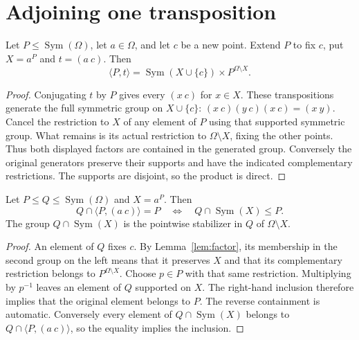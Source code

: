 \documentclass[a4paper,11pt]{article}
\newcommand{\Sym}{\operatorname{Sym}}\newcommand{\Alt}{\operatorname{Alt}}
\newcommand{\gen}[1]{\langle#1\rangle}
\begin{document}
\section{Adjoining one transposition}
\begin{lemma}\label{lem:factor}
Let $P\leq\Sym(\Omega)$, let $a\in\Omega$, and let $c$ be a new point.
Extend $P$ to fix $c$, put $X=a^P$ and $t=(a\ c)$. Then
\[
 \gen{P,t}=\Sym(X\cup\{c\})\times P^{\Omega\setminus X}.
\]
\end{lemma}
\begin{proof}
Conjugating $t$ by $P$ gives every $(x\ c)$ for $x\in X$. These
transpositions generate the full symmetric group on $X\cup\{c\}$:
$(x\ c)(y\ c)(x\ c)=(x\ y)$. Cancel the restriction to $X$ of
any element of $P$ using that supported symmetric group. What remains
is its actual restriction to $\Omega\setminus X$, fixing the other
points. Thus both displayed factors are contained in the generated
group. Conversely the original generators preserve their supports and
have the indicated complementary restrictions. The supports are disjoint,
so the product is direct.
\end{proof}

\begin{lemma}\label{lem:kernel}
Let $P\leq Q\leq\Sym(\Omega)$ and $X=a^P$. Then
\[
 Q\cap\gen{P,(a\ c)}=P
 \quad\Longleftrightarrow\quad Q\cap\Sym(X)\leq P.
\]
The group $Q\cap\Sym(X)$ is the pointwise stabilizer in $Q$ of
$\Omega\setminus X$.
\end{lemma}
\begin{proof}
An element of $Q$ fixes $c$. By Lemma~\ref{lem:factor}, its membership
in the second group on the left means that it preserves $X$ and that
its complementary restriction belongs to $P^{\Omega\setminus X}$.
Choose $p\in P$ with that same restriction. Multiplying by $p^{-1}$
leaves an element of $Q$ supported on $X$. The right-hand inclusion
therefore implies that the original element belongs to $P$. The reverse
containment is automatic. Conversely every element of $Q\cap\Sym(X)$
belongs to $Q\cap\gen{P,(a\ c)}$, so the equality implies the inclusion.
\end{proof}
\end{document}
